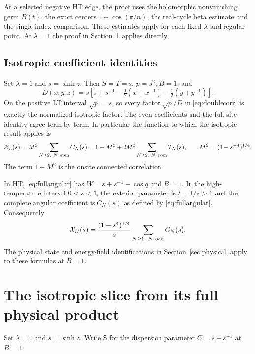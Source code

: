 \documentclass[11pt]{article}
\numberwithin{equation}{section}
\theoremstyle{definition}
\begin{document}
At a selected negative HT edge, the proof uses the holomorphic
nonvanishing germ $B(t)$, the exact centers $1-\cos(\pi/n)$,
the real-cycle beta estimate and the single-index comparison.
These estimates apply for each fixed $\lambda$ and regular point.
At $\lambda=1$ the proof in Section~\ref{sec:iso-internal} applies
directly.

\subsection{Isotropic coefficient identities}
Set $\lambda=1$ and $s=\sinh z$. Then $S=T=s$, $p=s^2$, $B=1$, and
\[
 D(x,y;z)=s\left[s+s^{-1}
                  -\tfrac12(x+x^{-1})-\tfrac12(y+y^{-1})\right].
\]
On the positive LT interval $\sqrt p=s$, so every factor
$\sqrt p/D$ in \eqref{eq:doublecorr} is exactly the normalized
isotropic factor.
The even coefficients and the full-site identity agree term by term.
In particular the function to which the isotropic result applies is
\begin{equation}\label{eq:iso-LT-interface}
 \mathcal X_L(s)=M^2\sum_{N\ge2,\ N\ {\rm even}}C_N(s)
 =1-M^2+2M^2\sum_{N\ge2,\ N\ {\rm even}}T_N(s),
 \qquad M^2=(1-s^{-4})^{1/4}.
\end{equation}
The term $1-M^2$ is the onsite connected correlation.

In HT, \eqref{eq:fullangular} has $W=s+s^{-1}-\cos q$ and
$B=1$. In the high-temperature interval $0<s<1$, the exterior
parameter is $t=1/s>1$ and the complete angular coefficient is
$C_N(s)$ as defined by \eqref{eq:fullangular}. Consequently
\begin{equation}\label{eq:iso-HT-interface}
 \mathcal X_H(s)=\frac{(1-s^4)^{1/4}}s
       \sum_{N\ge1,\ N\ {\rm odd}}C_N(s).
\end{equation}
The physical state and energy-field identifications in
Section~\ref{sec:physical} apply to these formulas at $B=1$.

\section{The isotropic slice from its full physical product}
\label{sec:iso-internal}

Set $\lambda=1$ and $s=\sinh z$. Write $\mathsf S$ for the
dispersion parameter $C=s+s^{-1}$ at $B=1$.
\end{document}
